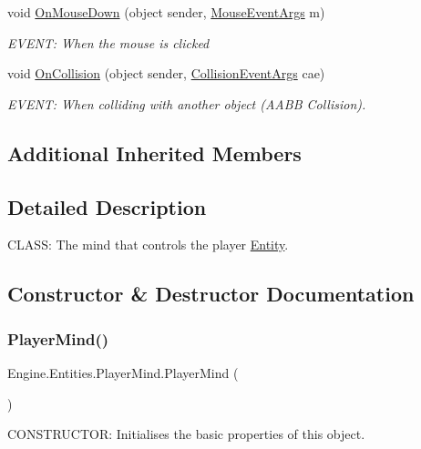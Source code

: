 \begin{DoxyCompactItemize}
void \hyperlink{a00326_a25869d97c0416cc348d589fb423b9d05}{On\+Mouse\+Down} (object sender, \hyperlink{a00374}{Mouse\+Event\+Args} m)
\begin{DoxyCompactList}\small\item\em E\+V\+E\+NT\+: When the mouse is clicked \end{DoxyCompactList}\item 
void \hyperlink{a00326_a008321c6a6ec30ed7ef82f13f6dc6d4e}{On\+Collision} (object sender, \hyperlink{a00350}{Collision\+Event\+Args} cae)
\begin{DoxyCompactList}\small\item\em E\+V\+E\+NT\+: When colliding with another object (A\+A\+BB Collision). \end{DoxyCompactList}\end{DoxyCompactItemize}
\subsection*{Additional Inherited Members}


\subsection{Detailed Description}
C\+L\+A\+SS\+: The mind that controls the player \hyperlink{a00314}{Entity}. 



\subsection{Constructor \& Destructor Documentation}
\mbox{\label{a00326_a67a26082f1d70a5c4495cb0ece0cce33}} 
\subsubsection{\texorpdfstring{Player\+Mind()}{PlayerMind()}}
{\footnotesize\ttfamily Engine.\+Entities.\+Player\+Mind.\+Player\+Mind (\begin{DoxyParamCaption}{ }\end{DoxyParamCaption})\hspace{0.3cm}{\ttfamily [inline]}}



C\+O\+N\+S\+T\+R\+U\+C\+T\+OR\+: Initialises the basic properties of this object. 

